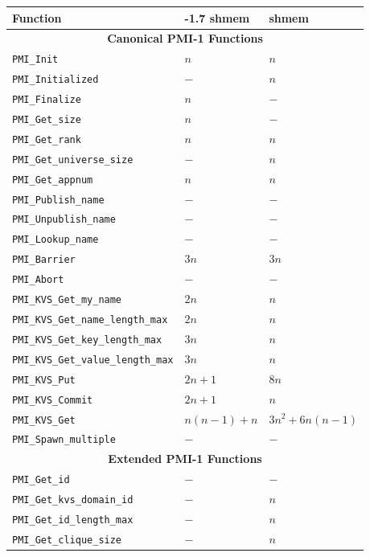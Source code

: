 \begin{table}
\centering
\begin{tabular}{|p{8cm}|p{3.5cm}|p{3cm}|}\hline
\textbf{Function} & \textbf{\mvapich2-1.7 shmem} & \textbf{\openmpi-1.6 shmem}\\
\hline
\multicolumn{3}{|c|}{\textbf{Canonical PMI-1 Functions}}\\
\hline
{\tt  PMI\_Init} & $n$ & $n$\\
\hline
{\tt  PMI\_Initialized} & $-$ & $n$\\
\hline
{\tt  PMI\_Finalize} & $n$ & $-$\\
\hline
{\tt  PMI\_Get\_size} & $n$ & $-$\\
\hline
{\tt  PMI\_Get\_rank} & $n$ & $n$\\
\hline
{\tt  PMI\_Get\_universe\_size} & $-$ & $n$\\
\hline
{\tt  PMI\_Get\_appnum} & $n$ & $n$\\
\hline
{\tt  PMI\_Publish\_name} & $-$ & $-$\\
\hline
{\tt  PMI\_Unpublish\_name} & $-$ & $-$\\
\hline
{\tt  PMI\_Lookup\_name} & $-$ & $-$\\
\hline
{\tt  PMI\_Barrier} & $3n$ & $3n$ \\
\hline
{\tt  PMI\_Abort} & $-$ & $-$\\
\hline
{\tt  PMI\_KVS\_Get\_my\_name} & $2n$ & $n$\\
\hline
{\tt  PMI\_KVS\_Get\_name\_length\_max} & $2n$ & $n$\\
\hline
{\tt  PMI\_KVS\_Get\_key\_length\_max} & $3n$ & $n$\\
\hline
{\tt  PMI\_KVS\_Get\_value\_length\_max} & $3n$ & $n$\\
\hline
{\tt  PMI\_KVS\_Put} & $2n + 1$ & $8n$\\
\hline
{\tt  PMI\_KVS\_Commit} & $2n + 1$ & $n$\\
\hline
{\tt  PMI\_KVS\_Get} & $n(n -1) + n$ & $3n^2 + 6n(n - 1)$ \\
\hline
{\tt  PMI\_Spawn\_multiple} & $-$ & $-$ \\
\hline
\multicolumn{3}{|c|}{\textbf{Extended PMI-1 Functions}}\\
\hline
{\tt  PMI\_Get\_id} & $-$ & $-$ \\
\hline
{\tt  PMI\_Get\_kvs\_domain\_id} & $-$ & $n$ \\
\hline
{\tt  PMI\_Get\_id\_length\_max} & $-$ & $n$ \\
\hline
{\tt  PMI\_Get\_clique\_size} & $-$ & $n$ \\

\end{tabular}
\end{table}
